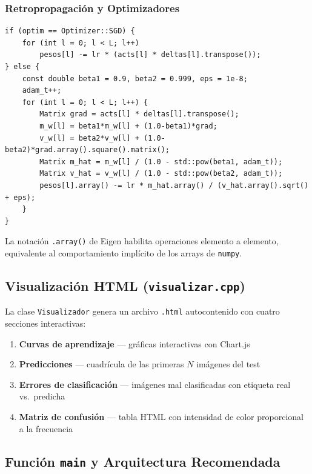 \subsubsection{Retropropagación y Optimizadores}

\begin{lstlisting}[style=cpp, caption={Actualización SGD y Adam en C++}]
if (optim == Optimizer::SGD) {
    for (int l = 0; l < L; l++)
        pesos[l] -= lr * (acts[l] * deltas[l].transpose());
} else {
    const double beta1 = 0.9, beta2 = 0.999, eps = 1e-8;
    adam_t++;
    for (int l = 0; l < L; l++) {
        Matrix grad = acts[l] * deltas[l].transpose();
        m_w[l] = beta1*m_w[l] + (1.0-beta1)*grad;
        v_w[l] = beta2*v_w[l] + (1.0-beta2)*grad.array().square().matrix();
        Matrix m_hat = m_w[l] / (1.0 - std::pow(beta1, adam_t));
        Matrix v_hat = v_w[l] / (1.0 - std::pow(beta2, adam_t));
        pesos[l].array() -= lr * m_hat.array() / (v_hat.array().sqrt() + eps);
    }
}
\end{lstlisting}

La notación \texttt{.array()} de Eigen habilita operaciones elemento a elemento, equivalente
al comportamiento implícito de los arrays de \texttt{numpy}.

\subsection{Visualización HTML (\texttt{visualizar.cpp})}

La clase \texttt{Visualizador} genera un archivo \texttt{.html} autocontenido con cuatro
secciones interactivas:

\begin{enumerate}[noitemsep]
    \item \textbf{Curvas de aprendizaje} --- gráficas interactivas con Chart.js
    \item \textbf{Predicciones} --- cuadrícula de las primeras $N$ imágenes del test
    \item \textbf{Errores de clasificación} --- imágenes mal clasificadas con etiqueta real vs.\ predicha
    \item \textbf{Matriz de confusión} --- tabla HTML con intensidad de color proporcional a la frecuencia
\end{enumerate}

\subsection{Función \texttt{main} y Arquitectura Recomendada}


